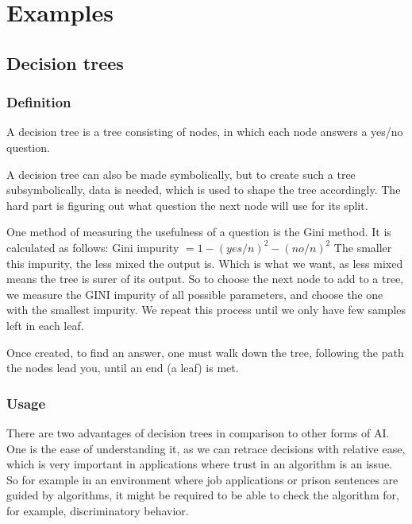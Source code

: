 \chapter{Examples}




\section{Decision trees}
\subsection{Definition}

A decision tree is a tree consisting of nodes, in which each node answers a yes/no question. 

A decision tree can also be made symbolically, but to create such a tree  subsymbolically, data is needed, which is used to shape the tree accordingly.
The hard part is figuring out what question the next node will use for its split. 

One method of measuring the usefulness of a question is the Gini method.
It is calculated as follows: Gini impurity $= 1-(yes/n)^2-(no/n)^2$
The smaller this impurity, the less mixed the output is. Which is what we want, as less mixed means the tree is surer of its output. 
So to choose the next node to add to a tree, we measure the GINI impurity of all possible parameters, and choose the one with the smallest impurity. We repeat this process until we only have few samples left in each leaf. %

Once created, to find an answer, one must walk down the tree, following the path the nodes lead you, until an end (a leaf) is met.

\subsection{Usage}
There are two advantages of decision trees in comparison to other forms of AI. One is the ease of understanding it, as we can retrace decisions with relative ease, which is very important in applications where trust in an algorithm is an issue. So for example in an environment where job applications or prison sentences are guided by algorithms, it might be required to be able to check the algorithm for, for example, discriminatory behavior.

